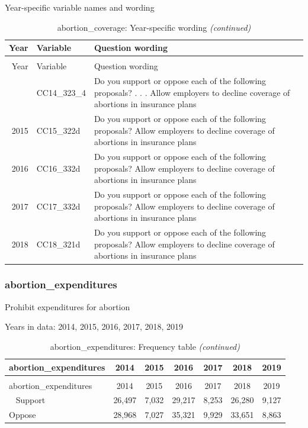 \documentclass[12pt]{article}
\begin{document}
Year-specific variable names and wording

\begin{longtable}[t]{rl>{\raggedright\arraybackslash}p{10cm}}
\caption{\label{tab:unnamed-chunk-4}abortion\_coverage: Year-specific wording}\\
\toprule
Year & Variable & Question wording\\
\midrule
\endfirsthead
\caption[]{abortion\_coverage: Year-specific wording \textit{(continued)}}\\
\toprule
Year & Variable & Question wording\\
\midrule
\endhead
\
\endfoot
\bottomrule
\endlastfoot
2014 & CC14\_323\_4 & Do you support or oppose each of the following proposals? . . . Allow employers to decline coverage of abortions in insurance plans\\
2015 & CC15\_322d & Do you support or oppose each of the following proposals? Allow employers to decline coverage of abortions in insurance plans\\
2016 & CC16\_332d & Do you support or oppose each of the following proposals? Allow employers to decline coverage of abortions in insurance plans\\
2017 & CC17\_332d & Do you support or oppose each of the following proposals? Allow employers to decline coverage of abortions in insurance plans\\
2018 & CC18\_321d & Do you support or oppose each of the following proposals? Allow employers to decline coverage of abortions in insurance plans\\*
\end{longtable}

\subsubsection{abortion\_expenditures}\label{abortion_expenditures}

Prohibit expenditures for abortion

Years in data: 2014, 2015, 2016, 2017, 2018, 2019

\begin{longtable}[t]{lcccccc}
\caption{\label{tab:unnamed-chunk-4}abortion\_expenditures: Frequency table}\\
\toprule
abortion\_expenditures & 2014 & 2015 & 2016 & 2017 & 2018 & 2019\\
\midrule
\endfirsthead
\caption[]{abortion\_expenditures: Frequency table \textit{(continued)}}\\
\toprule
abortion\_expenditures & 2014 & 2015 & 2016 & 2017 & 2018 & 2019\\
\midrule
\endhead
\
\endfoot
\bottomrule
\endlastfoot
Support & 26,497 & 7,032 & 29,217 & 8,253 & 26,280 & 9,127\\
Oppose & 28,968 & 7,027 & 35,321 & 9,929 & 33,651 & 8,863\\*
\end{longtable}
\end{document}
